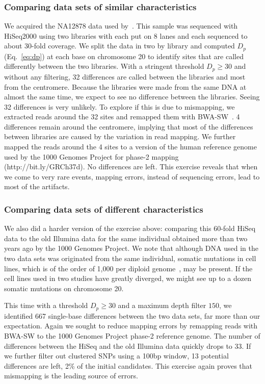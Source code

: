 \documentclass{bioinfo}
\begin{document}
\subsubsection{Comparing data sets of similar characteristics}
We acquired the NA12878 data used by~\citet{Depristo:2011vn}. This sample was sequenced
with HiSeq2000 using two libraries with each put on 8 lanes and each sequenced
to about 30-fold coverage.  We split the data in two by library and computed
$D_p$ (Eq.~\ref{eq:dp}) at each base on chromosome 20 to identify sites that
are called differently between the two libraries.  With a stringent threshold
$D_p\ge 30$ and without any filtering, 32 differences are called between
the libraries and most from the centromere. Because the libraries were made
from the same DNA at almost the same time, we expect to see no difference
between the libraries. Seeing 32 differences is very unlikely. To explore if
this is due to mismapping, we extracted reads around the 32 sites and remapped
them with BWA-SW~\citep{Li:2010fk}. 4 differences remain around the centromere,
implying that most of the differences between libraries are caused by the
variation in read mapping.  We further mapped the reads around the 4 sites to a
version of the human reference genome used by the 1000 Genomes Project for
phase-2 mapping (http://bit.ly/GRCh37d).  No differences
are left. This exercise reveals that when we come to very rare events,
mapping errors, instead of sequencing errors, lead to most of the artifacts.

\subsubsection{Comparing data sets of different characteristics}
We also did a harder version of the exercise above: comparing this 60-fold
HiSeq data to the old Illumina data for the same individual obtained more than
two years ago by the 1000 Genomes Project. We note that although DNA used in
the two data sets was originated from the same individual, somatic mutations in
cell lines, which is of the order of 1,000 per diploid
genome~\citep{Conrad:2011kx}, may be present. If the cell lines used in two
studies have greatly diverged, we might see up to a dozen somatic mutations
on chromosome 20.

This time with a threshold $D_p\ge 30$ and a maximum depth filter $150$, we
identified 667 single-base differences between the two data sets, far more than
our expectation. Again we sought to reduce mapping errors by remapping reads
with BWA-SW to the 1000 Genomes Project phase-2 reference genome. The number of
differences between the HiSeq and the old Illumina data quickly drops to 33.
If we further filter out clustered SNPs using a 100bp window, 13 potential differences
are left, 2\% of the initial candidates. This exercise again proves that
mismapping is the leading source of errors.
\end{document}
